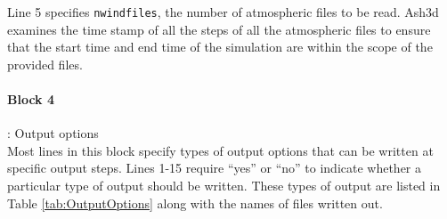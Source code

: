 Line 5 specifies \texttt{nwindfiles}, the number of atmospheric files to be read.
Ash3d examines the time stamp of all the steps of all the atmospheric files to ensure
that the start time and end time of the simulation are within the scope of the
provided files.

\paragraph{Block 4}: Output options\\
Most lines in this block specify types of output options that can be written at
specific output steps.
Lines 1-15 require ``yes'' or ``no'' to indicate whether a particular type of output
should be written. These types of output are listed in Table \ref{tab:OutputOptions}
along with the names of files written out.
\small

